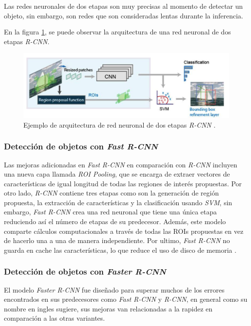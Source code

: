 Las redes neuronales de dos etapas son muy precisas al momento de detectar un objeto, sin embargo, son redes que son consideradas lentas durante la inferencia.

En la figura \ref{fig:rcnn}, se puede observar la arquitectura de una red neuronal de dos etapas \textit{R-CNN}.

\begin{figure}[ht]
	\centering
	\includegraphics[scale=.25]{./Figures/R-CNN.png}
	\caption{Ejemplo de arquitectura de red neuronal de dos etapas \textit{R-CNN} \cite{WEBSITE:6}.}
	\label{fig:rcnn}
\end{figure}

\subsubsection{Detección de objetos con \textit{Fast R-CNN}}

Las mejoras adicionadas en \textit{Fast R-CNN} en comparación con \textit{R-CNN} incluyen una nueva capa llamada \textit{ROI Pooling}, que se encarga de extraer vectores de características de igual longitud de todas las regiones de interés propuestas. Por otro lado, \textit{R-CNN} contiene tres etapas como son la generación de región propuesta, la extracción de características y la clasificación usando \textit{SVM}, sin embargo, \textit{Fast R-CNN} crea una red neuronal que tiene una única etapa reduciendo así el número de etapas de su predecesor. Además, este modelo comparte cálculos computacionales a través de todas las ROIs propuestas en vez de hacerlo una a una de manera independiente. Por ultimo, \textit{Fast R-CNN} no guarda en cache las características, lo que reduce el uso de disco de memoria \cite{ARTICLE:10}.

\subsubsection{Detección de objetos con \textit{Faster R-CNN}}

El modelo \textit{Faster R-CNN} fue diseñado para superar muchos de los errores encontrados en sus predecesores como \textit{Fast R-CNN} y \textit{R-CNN}, en general como su nombre en ingles sugiere, sus mejoras van relacionadas a la rapidez en comparación a las otras variantes.

